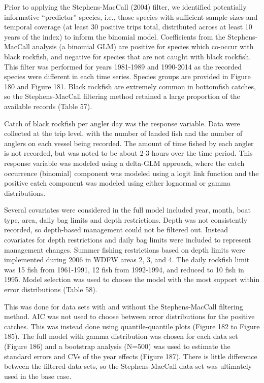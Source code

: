 \documentclass[11pt,
  english,
  letterpaper,
]{article}
\begin{document}
Prior to applying the Stephens-MacCall (2004) filter, we identified potentially informative ``predictor'' species, i.e., those species with sufficient sample sizes and temporal coverage (at least 30 positive trips total, distributed across at least 10 years of the index) to inform the binomial model. Coefficients from the Stephens-MacCall analysis (a binomial GLM) are positive for species which co-occur with black rockfish, and negative for species that are not caught with black rockfish. This filter was performed for years 1981-1989 and 1990-2014 as the recorded species were different in each time series. Species groups are provided in Figure 180 and Figure 181. Black rockfish are extremely common in bottomfish catches, so the Stephens-MacCall filtering method retained a large proportion of the available records (Table 57).

Catch of black rockfish per angler day was the response variable. Data were collected at the trip level, with the number of landed fish and the number of anglers on each vessel being recorded. The amount of time fished by each angler is not recorded, but was noted to be about 2-3 hours over the time period. This response variable was modeled using a delta-GLM approach, where the catch occurrence (binomial) component was modeled using a logit link function and the positive catch component was modeled using either lognormal or gamma distributions.

Several covariates were considered in the full model included year, month, boat type, area, daily bag limits and depth restrictions. Depth was not consistently recorded, so depth-based management could not be filtered out. Instead covariates for depth restrictions and daily bag limits were included to represent management changes. Summer fishing restrictions based on depth limits were implemented during 2006 in WDFW areas 2, 3, and 4. The daily rockfish limit was 15 fish from 1961-1991, 12 fish from 1992-1994, and reduced to 10 fish in 1995. Model selection was used to choose the model with the most support within error distributions (Table 58).

This was done for data sets with and without the Stephens-MacCall filtering method. AIC was not used to choose between error distributions for the positive catches. This was instead done using quantile-quantile plots (Figure 182 to Figure 185). The full model with gamma distribution was chosen for each data set (Figure 186) and a bootstrap analysis (N=500) was used to estimate the standard errors and CVs of the year effects (Figure 187). There is little difference between the filtered-data sets, so the Stephens-MacCall data-set was ultimately used in the base case.
\end{document}
